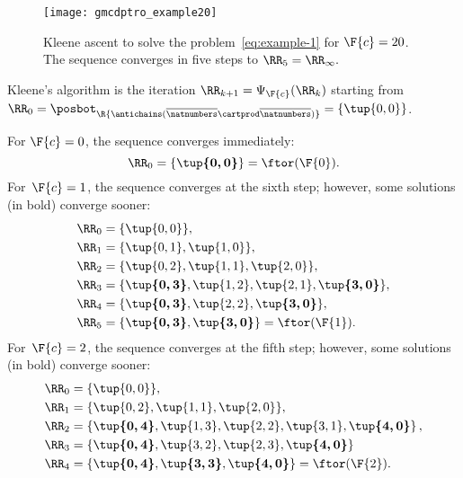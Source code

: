 \begin{figure}
	\begin{centering}
		\texttt{[image: gmcdptro\_example20]}
	\end{centering}
	\caption{Kleene ascent to solve the problem~\cref{eq:example-1} for $\F{c}=20$.
		The sequence converges in five steps to $\RR_{5}=\RR_{\infty}.
		$ }
	\label{fig:example24}
\end{figure}

\noindent Kleene's algorithm is the iteration $\RR_{k+1}=\Psi_{\F{c}}(\RR_{k})$
starting from $\RR_{0}=\posbot_{\R{\antichains(\overline{\natnumbers}\cartprod\overline{\natnumbers})}}=\{\tup{ 0,0} \}$.

\noindent For $\F{c}=0$, the sequence converges immediately:
\begin{equation*}
	\RR_{0}=\{\boldsymbol{\tup{ 0,0} }\}=\ftor(\F{0}).
\end{equation*}
For~$\F{c}=1$, the sequence converges at the sixth step; however, some solutions (in bold) converge sooner:
\begin{align*}
	\RR_{0} & =\{\tup{0,0} \},                                                         \\
	\RR_{1} & =\{\tup{0,1},\tup{1,0}\},                                                \\
	\RR_{2} & =\{\tup{0,2},\tup{1,1}, \tup{2,0}\},                                     \\
	\RR_{3} & =\{\boldsymbol{\tup{0,3}},\tup{1,2}, \tup{2,1},\boldsymbol{\tup{3,0}}\}, \\
	\RR_{4} & =\{\boldsymbol{\tup{0,3}},\tup{2,2},\boldsymbol{\tup{3,0}}\},            \\
	\RR_{5} & =\{\boldsymbol{\tup{0,3}},\boldsymbol{\tup{3,0}}\}=\ftor(\F{1}).
\end{align*}
For~$\F{c}=2$, the sequence converges at the fifth step; however,
some solutions (in bold) converge sooner:
\begin{align*}
	\RR_{0} & =\{\tup{ 0,0} \},                                                                                      \\
	\RR_{1} & =\{\tup{ 0,2} ,\tup{ 1,1} ,\tup{ 2,0} \},                                                              \\
	\RR_{2} & =\left\{ \boldsymbol{\tup{ 0,4} }, \tup{1,3}, \tup{2,2}, \tup{3,1}, \boldsymbol{\tup{ 4,0} }\right\} , \\
	\RR_{3} & =\{\boldsymbol{\tup{0,4} },\tup{ 3,2}, \tup{2,3}, \boldsymbol{\tup{ 4,0} }\}                           \\
	\RR_{4} & =\{\boldsymbol{\tup{0,4} },\boldsymbol{\tup{ 3,3}},\boldsymbol{\tup{ 4,0} }\}=\ftor(\F{2}).
\end{align*}
